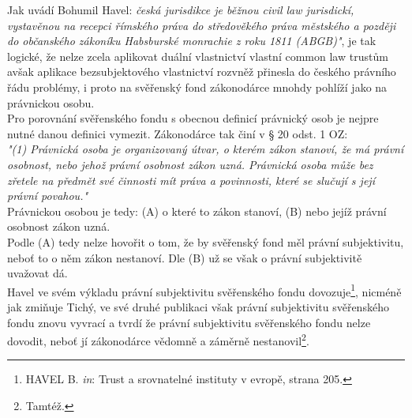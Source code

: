 \documentclass{article}
\begin{document}
Jak uvádí Bohumil Havel: \textit{česká jurisdikce je běžnou civil law jurisdickí, vystavěnou na recepci římského práva do středověkého práva městského a později do občanského zákoníku Habsburské monrachie z roku 1811 (ABGB)"}, je tak logické, že nelze zcela aplikovat duální vlastnictví vlastní common law trustům avšak aplikace bezsubjektového vlastnictví rozvněž přinesla do českého právního řádu problémy, i proto na svěřenský fond zákonodárce mnohdy pohlíží jako na právnickou osobu. \\

Pro porovnání svěřenského fondu s obecnou definicí právnický osob je nejpre nutné danou definici vymezit. Zákonodárce tak činí v § 20 odst. 1 OZ: \\

\textit{"(1) Právnická osoba je organizovaný útvar, o kterém zákon stanoví, že má právní osobnost, nebo jehož právní osobnost zákon uzná. Právnická osoba může bez zřetele na předmět své činnosti mít práva a povinnosti, které se slučují s její právní povahou."}\\

Právnickou osobou je tedy: (A) o které to zákon stanoví, (B) nebo jejíž právní osobnost zákon uzná.\\

Podle (A) tedy nelze hovořit o tom, že by svěřenský fond měl právní subjektivitu, neboť to o něm zákon nestanoví. Dle (B) už se však o právní subjektivitě uvažovat dá.\\

Havel ve svém výkladu právní subjektivitu svěřenského fondu dovozuje\footnote{HAVEL B. \textit{in}: Trust a srovnatelné instituty v evropě, strana 205.}, nicméně jak zmiňuje Tichý, ve své druhé publikaci však právní subjektivitu svěřenského fondu znovu vyvrací a tvrdí že právní subjektivitu svěřenského fondu nelze dovodit, neboť jí zákonodárce vědomně a záměrně nestanovil\footnote{Tamtéž.}.\\
\end{document}
